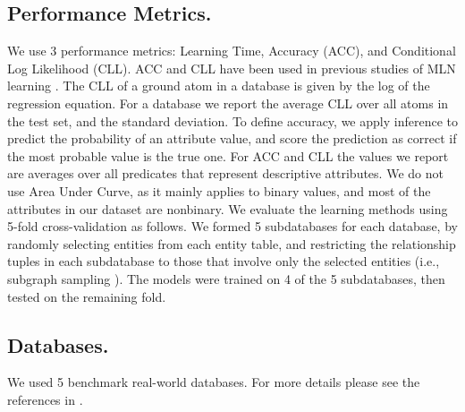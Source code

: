 \documentclass{article}
\begin{document}
\subsection{Performance Metrics.}
We use 3 performance metrics: %
Learning Time, Accuracy (ACC), and Conditional Log Likelihood (CLL). ACC and CLL have been used in previous studies of MLN learning  \cite{Domingos2007,Schulte2012}. The CLL of a ground atom in a database is given by the log of the regression equation. For a database we report the average CLL over all atoms in the test set, and the standard deviation. To define accuracy, we apply inference to predict the probability of an attribute value, and score the prediction as correct if the most probable value is the true one. For ACC and CLL the values we report are averages over all predicates that represent descriptive attributes. 
We do not use Area Under Curve, as it mainly applies to binary values, and most of the attributes in our dataset are nonbinary. 
We evaluate the learning methods using 5-fold cross-validation as follows. We formed 5 subdatabases for each database, by randomly selecting entities from each entity table, and restricting the relationship tuples in each subdatabase to those that involve only the selected entities  (i.e., subgraph sampling \cite{Frank1977,Schulte2012}). The models were trained on 4 of the 5 subdatabases, then tested on the remaining fold. 

\subsection{Databases.}

We used %
5 benchmark real-world databases.   
For more details please see the references in \cite{Schulte2012}.
\end{document}

